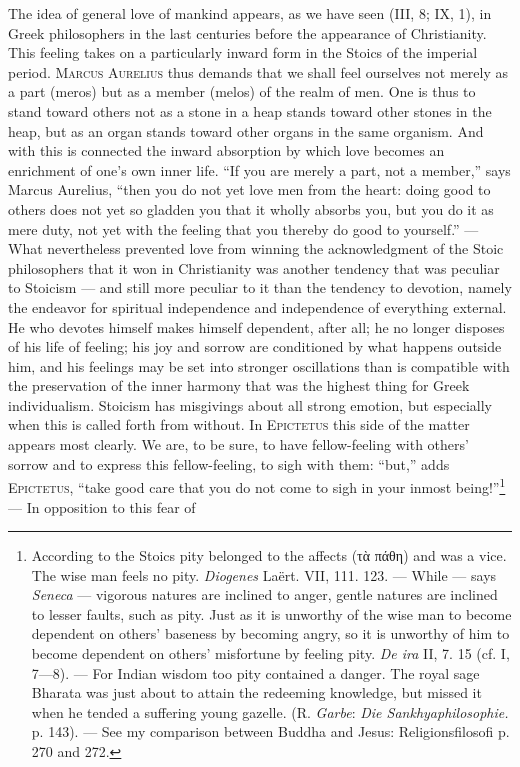 \documentclass[12pt,a4paper,openany]{book}
\newcommand{\opage}[1]{\marginnote{\footnotesize\textit{[#1]}}}
\begin{document}
The idea of general love of mankind appears, as we have seen (III, 8; IX, 1), in Greek philosophers in the last
centuries before the appearance of Christianity. This feeling takes on a particularly inward form in the Stoics of
the imperial period. \textsc{Marcus Aurelius} thus demands that we shall feel ourselves not merely as a part (meros)
but as a member (melos) of the realm of men. One is thus to stand toward others not as a stone in a heap stands
toward other stones in the heap, but as an organ stands toward other organs in the same organism. And with this is
connected the inward absorption by which love
\opage{239}becomes an enrichment of one's own inner life. ``If you are merely a part, not a member,'' says Marcus
Aurelius, ``then you do not yet love men from the heart: doing good to others does not yet so gladden you that it
wholly absorbs you, but you do it as mere duty, not yet with the feeling that you thereby do good to yourself.'' ---
What nevertheless prevented love from winning the acknowledgment of the Stoic philosophers that it won in
Christianity was another tendency that was peculiar to Stoicism --- and still more peculiar to it than the tendency
to devotion, namely the endeavor for spiritual independence and independence of everything external. He who devotes
himself makes himself dependent, after all; he no longer disposes of his life of feeling; his joy and sorrow are
conditioned by what happens outside him, and his feelings may be set into stronger oscillations than is compatible
with the preservation of the inner harmony that was the highest thing for Greek individualism. Stoicism has
misgivings about all strong emotion, but especially when this is called forth from without. In \textsc{Epictetus}
this side of the matter appears most clearly. We are, to be sure, to have fellow-feeling with others' sorrow and to
express this fellow-feeling, to sigh with them: ``but,'' adds \textsc{Epictetus}, ``take good care that you do not
come to sigh in your inmost being!''\footnote[1]{According to the Stoics pity belonged to the affects (τὰ πάθη)
and was a vice. The wise man feels no pity. \emph{Diogenes} Laërt. VII, 111. 123. --- While --- says
\emph{Seneca} --- vigorous natures are inclined to anger, gentle natures are inclined to lesser faults, such as pity.
Just as it is unworthy of the wise man to become dependent on others' baseness by becoming angry, so it is unworthy of
him to become dependent on others' misfortune by feeling pity. \textit{De ira} II, 7. 15 (cf. I, 7---8). --- For
Indian wisdom too pity contained a danger. The royal sage Bharata was just about to attain the redeeming knowledge,
but missed it when he tended a suffering young gazelle. (R. \emph{Garbe}: \textit{Die Sankhyaphilosophie.} p. 143).
--- See my comparison between Buddha and Jesus: Religionsfilosofi p. 270 and 272.} --- In opposition to this fear of
\end{document}
